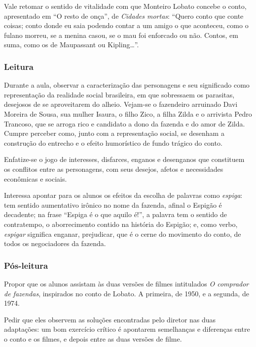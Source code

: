 \documentclass[11pt]{extarticle}
\begin{document}
Vale retomar o sentido de vitalidade com que Monteiro Lobato concebe o
conto, apresentado em ``O resto de onça'', de \emph{Cidades mortas}:
``Quero conto que conte coisas; conto donde eu saia podendo contar a um
amigo o que aconteceu, como o fulano morreu, se a menina casou, se o mau
foi enforcado ou não. Contos, em suma, como os de Maupassant ou
Kipling\ldots{}''.

\subsubsection{Leitura}


Durante a aula, observar a caracterização das personagens e seu significado como
representação da realidade social brasileira, em que sobressaem os
parasitas, desejosos de se aproveitarem do alheio. Vejam-se o fazendeiro
arruinado Davi Moreira de Sousa, sua mulher Isaura, o filho Zico, a
filha Zilda e o arrivista Pedro Trancoso, que se arroga rico e candidato
a dono da fazenda e do amor de Zilda. Cumpre perceber como, junto com a
representação social, se desenham a construção do entrecho e o efeito
humorístico de fundo trágico do conto. 

Enfatize-se o jogo de interesses,
disfarces, enganos e desenganos que constituem os conflitos entre as
personagens, com seus desejos, afetos e necessidades econômicas e
sociais. 

Interessa apontar para os alunos os efeitos da escolha de
palavras como \emph{espiga}: tem sentido aumentativo irônico no nome da
fazenda, afinal o Espigão é decadente; na frase ``Espiga é o que aquilo
é!'', a palavra tem o sentido de contratempo, o aborrecimento contido na
história do Espigão; e, como verbo, \emph{espigar} significa enganar,
prejudicar, que é o cerne do movimento do conto, de todos os
negociadores da fazenda.

\subsubsection{Pós-leitura}

Propor que os alunos assistam às duas versões de filmes intitulados
\emph{O comprador de fazendas}, inspirados no conto de Lobato. A
primeira, de 1950, e a segunda, de 1974.

Pedir que eles observem as soluções encontradas pelo diretor nas duas
adaptações: um bom exercício crítico é apontarem semelhanças e
diferenças entre o conto e os filmes, e depois entre as duas versões de
filme.
\end{document}
